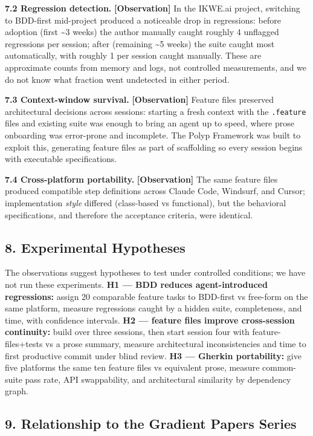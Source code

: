 \textbf{7.2 Regression detection.} \textbf{{[}Observation{]}} In the
IKWE.ai project, switching to BDD-first mid-project produced a
noticeable drop in regressions: before adoption (first \textasciitilde3
weeks) the author manually caught roughly 4 unflagged regressions per
session; after (remaining \textasciitilde5 weeks) the suite caught most
automatically, with roughly 1 per session caught manually. These are
approximate counts from memory and logs, not controlled measurements,
and we do not know what fraction went undetected in either period.

\textbf{7.3 Context-window survival.} \textbf{{[}Observation{]}} Feature
files preserved architectural decisions across sessions: starting a
fresh context with the \texttt{.feature} files and existing suite was
enough to bring an agent up to speed, where prose onboarding was
error-prone and incomplete. The Polyp Framework was built to exploit
this, generating feature files as part of scaffolding so every session
begins with executable specifications.

\textbf{7.4 Cross-platform portability.} \textbf{{[}Observation{]}} The
same feature files produced compatible step definitions across Claude
Code, Windsurf, and Cursor; implementation \emph{style} differed
(class-based vs functional), but the behavioral specifications, and
therefore the acceptance criteria, were identical.

\subsection{8. Experimental Hypotheses}\label{experimental-hypotheses}

The observations suggest hypotheses to test under controlled conditions;
we have not run these experiments. \textbf{H1 --- BDD reduces
agent-introduced regressions:} assign 20 comparable feature tasks to
BDD-first vs free-form on the same platform, measure regressions caught
by a hidden suite, completeness, and time, with confidence intervals.
\textbf{H2 --- feature files improve cross-session continuity:} build
over three sessions, then start session four with feature-files+tests vs
a prose summary, measure architectural inconsistencies and time to first
productive commit under blind review. \textbf{H3 --- Gherkin
portability:} give five platforms the same ten feature files vs
equivalent prose, measure common-suite pass rate, API swappability, and
architectural similarity by dependency graph.

\subsection{9. Relationship to the Gradient Papers
Series}\label{relationship-to-the-gradient-papers-series}

